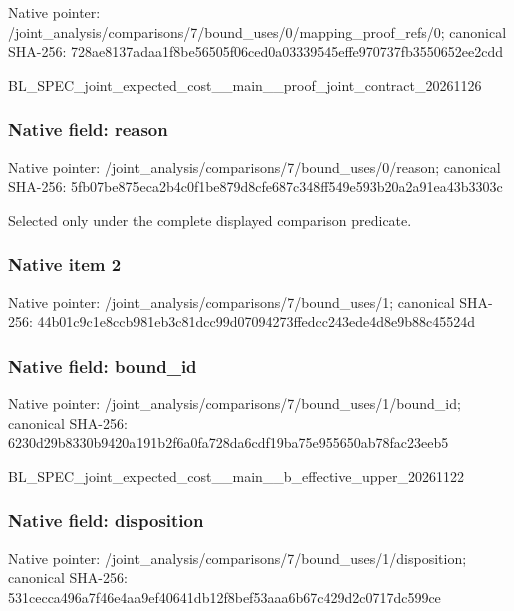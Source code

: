 \documentclass[10pt,a4paper]{article}
\begin{document}
Native pointer: /joint\_analysis/comparis\allowbreak{}ons/7/bound\_uses/0/mappi\allowbreak{}ng\_proof\_refs/0; canonical SHA-256: 728ae8137adaa1f8be56505f\allowbreak{}06ced0a03339545effe97073\allowbreak{}7fb3550652ee2cdd


BL\_SPEC\_joint\_expected\_c\allowbreak{}ost\_\_main\_\_proof\_joint\_c\allowbreak{}ontract\_20261126


\subsubsection{Native field: reason}


Native pointer: /joint\_analysis/comparis\allowbreak{}ons/7/bound\_uses/0/reaso\allowbreak{}n; canonical SHA-256: 5fb07be875eca2b4c0f1be87\allowbreak{}9d8cfe687c348ff549e593b2\allowbreak{}0a2a91ea43b3303c


Selected only under the complete displayed comparison predicate.


\subsubsection{Native item 2}


Native pointer: /joint\_analysis/comparis\allowbreak{}ons/7/bound\_uses/1; canonical SHA-256: 44b01c9c1e8ccb981eb3c81d\allowbreak{}cc99d07094273ffedcc243ed\allowbreak{}e4d8e9b88c45524d



\subsubsection{Native field: bound\_id}


Native pointer: /joint\_analysis/comparis\allowbreak{}ons/7/bound\_uses/1/bound\allowbreak{}\_id; canonical SHA-256: 6230d29b8330b9420a191b2f\allowbreak{}6a0fa728da6cdf19ba75e955\allowbreak{}650ab78fac23eeb5


BL\_SPEC\_joint\_expected\_c\allowbreak{}ost\_\_main\_\_b\_effective\_u\allowbreak{}pper\_20261122


\subsubsection{Native field: disposition}


Native pointer: /joint\_analysis/comparis\allowbreak{}ons/7/bound\_uses/1/dispo\allowbreak{}sition; canonical SHA-256: 531cecca496a7f46e4aa9ef4\allowbreak{}0641db12f8bef53aaa6b67c4\allowbreak{}29d2c0717dc599ce
\end{document}

